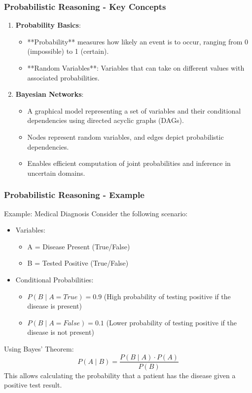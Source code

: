 \documentclass[aspectratio=169]{beamer}
\begin{document}
\begin{frame}[fragile]
    \frametitle{Probabilistic Reasoning - Key Concepts}
    \begin{enumerate}
        \item \textbf{Probability Basics}:
            \begin{itemize}
                \item **Probability** measures how likely an event is to occur, ranging from 0 (impossible) to 1 (certain).
                \item **Random Variables**: Variables that can take on different values with associated probabilities.
            \end{itemize}
        \item \textbf{Bayesian Networks}:
            \begin{itemize}
                \item A graphical model representing a set of variables and their conditional dependencies using directed acyclic graphs (DAGs).
                \item Nodes represent random variables, and edges depict probabilistic dependencies.
                \item Enables efficient computation of joint probabilities and inference in uncertain domains.
            \end{itemize}
    \end{enumerate}
\end{frame}

\begin{frame}[fragile]
    \frametitle{Probabilistic Reasoning - Example}
    \begin{block}{Example: Medical Diagnosis}
        Consider the following scenario:
        \begin{itemize}
            \item Variables: 
                \begin{itemize}
                    \item A = Disease Present (True/False)
                    \item B = Tested Positive (True/False)
                \end{itemize}
            \item Conditional Probabilities:
                \begin{itemize}
                    \item $P(B \mid A=True) = 0.9$ (High probability of testing positive if the disease is present)
                    \item $P(B \mid A=False) = 0.1$ (Lower probability of testing positive if the disease is not present)
                \end{itemize}
        \end{itemize}
        Using Bayes’ Theorem:
        \begin{equation}
            P(A \mid B) = \frac{P(B \mid A) \cdot P(A)}{P(B)}
        \end{equation}
        This allows calculating the probability that a patient has the disease given a positive test result.
    \end{block}
\end{frame}
\end{document}
